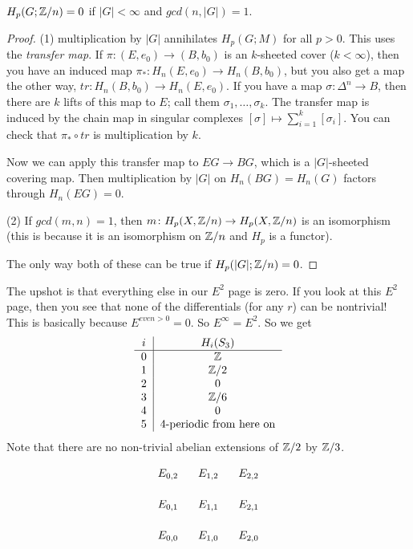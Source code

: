 \begin{lemma}
 $H_p(G;\mathbb{Z}/n)=0$ if $|G|<\infty$ and $gcd(n,|G|)=1$.
\end{lemma}
\begin{proof}
 (1) multiplication by $|G|$ annihilates $H_p(G;M)$ for all $p>0$. This uses the \emph{transfer map}. If $\pi\colon (E,e_0)\to (B,b_0)$ is an $k$-sheeted cover ($k<\infty$), then you have an induced map $\pi_*\colon H_n(E,e_0)\to H_n(B,b_0)$, but you also get a map the other way, $tr\colon H_n(B,b_0)\to H_n(E,e_0)$. If you have a map $\sigma\colon \Delta^n\to B$, then there are $k$ lifts of this map to $E$; call them $\sigma_1,\dots, \sigma_k$. The transfer map is induced by the chain map in singular complexes $[\sigma]\mapsto \sum_{i=1}^k [\sigma_i]$. You can check that $\pi_*\circ tr$ is multiplication by $k$.
 
 Now we can apply this transfer map to $EG\to BG$, which is a $|G|$-sheeted covering map. Then multiplication by $|G|$ on $H_n(BG)=H_n(G)$ factors through $H_n(EG)=0$.
  
 (2) If $gcd(m,n)=1$, then $m\colon H_p(X,\mathbb{Z}/n)\to H_p(X,\mathbb{Z}/n)$ is an isomorphism (this is because it is an isomorphism on $\mathbb{Z}/n$ and $H_p$ is a functor).
 
 The only way both of these can be true if $H_p(|G|;\mathbb{Z}/n)=0$.
\end{proof}
The upshot is that everything else in our $E^2$ page is zero. If you look at this $E^2$ page, then you see that none of the differentials (for any $r$) can be nontrivial! This is basically because $E^{even>0}=0$. So $E^\infty=E^2$. So we get
\[\begin{tabular}{c|c}
 $i$ & $H_i(S_3)$\\ \hline
 0&$\ZZ$\\
 1&$\ZZ/2$\\
 2&$0$\\
 3&$\ZZ/6$\\
 4&$0$\\
 5& 4-periodic from here on\\
\end{tabular}\]
Note that there are no non-trivial abelian extensions of $\mathbb{Z}/2$ by $\mathbb{Z}/3$.







\vspace{4cm}
\[\xymatrix @-1pc{
 E_{0,2} & E_{1,2} & E_{2,2}\\
 E_{0,1} & E_{1,1} & E_{2,1}\\
 E_{0,0} & E_{1,0} & E_{2,0}\\
}\]




